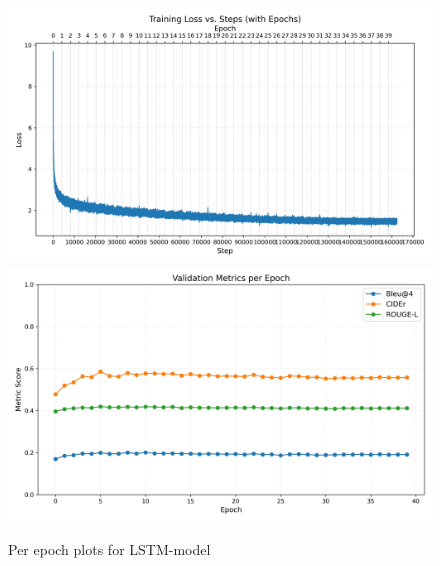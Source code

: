 \begin{figure}[H]
    \centering
    \includegraphics[width=0.8\linewidth]{Figures/model2_loss.jpg}
    \includegraphics[width=0.8\linewidth]{Figures/model2_metrics.jpg}
    \caption{Per epoch plots for LSTM-model}
    \label{fig:plot_model2}
\end{figure}

